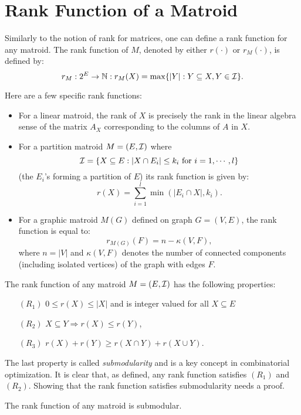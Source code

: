 \documentclass[12pt]{article}
\begin{document}
\section{Rank Function of a Matroid}

Similarly to the notion of rank for matrices, one can define a rank
function for any matroid. The rank function of $M$, denoted by either
$r(\cdot)$ or $r_M(\cdot)$, is defined by:
$$r_M:2^E \rightarrow {\mathbb N}: r_M(X)=\max\{|Y|: Y\subseteq X, Y\in {\cal
  I}\}.$$

Here are a few specific rank functions:
\begin{itemize}
\item
For a linear matroid, the rank of $X$ is precisely the rank in the
  linear algebra sense of the matrix $A_X$ corresponding to the
  columns of $A$ in $X$. 
\item
For a partition matroid $M=(E,{\cal I})$ where $${\cal I}=\{X\subseteq
  E: |X\cap E_i|\leq k_i \mbox{ for } i=1,\cdots, l\}$$ (the $E_i$'s
  forming a partition of $E$) its rank
  function is given by:
$$ r(X)=\sum_{i=1}^l \min(|E_i\cap X|, k_i).$$
\item
For a graphic matroid $M(G)$ defined on graph $G=(V,E)$, the rank
function is equal to: 
$$r_{M(G)}(F)= n - \kappa(V,F),$$ where $n=|V|$ and $\kappa(V,F)$ denotes the
number of connected components (including isolated vertices) of the
graph with edges $F$.
\end{itemize}

The rank function of any matroid $M=(E,{\cal I})$ has the following properties:
\begin{enumerate}
\item[$(R_1)$] $0\leq r(X)\leq |X|$ and is integer valued for all
  $X\subseteq E$
\item[$(R_2)$] $X\subseteq Y \Rightarrow r(X) \leq r(Y)$,
\item[$(R_3)$] $r(X)+r(Y) \geq r(X\cap Y) + r(X \cup Y)$.
\end{enumerate}
The last property is called {\it submodularity} and is a key concept in
combinatorial optimization. It is clear that, as defined, any rank
function satisfies $(R_1)$ and $(R_2)$. Showing that the rank function
satisfies submodularity needs a proof. 

\begin{lemma}
The rank function of any matroid is submodular.
\end{lemma}
\end{document}
